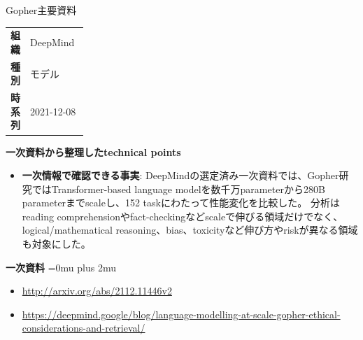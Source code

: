 \begin{technicalnote}{Gopher}{主要資料}
\begingroup
\begin{tabularx}{\linewidth}{@{}>{\bfseries}p{0.22\linewidth}X@{}}
組織 & DeepMind \\
種別 & モデル \\
時系列 & 2021-12-08 \\
\end{tabularx}
\smallskip
\begin{minipage}{\linewidth}
{\bfseries 一次資料から整理したtechnical points}
\begin{itemize}[leftmargin=1.5em,itemsep=0.35em]
\item \textbf{一次情報で確認できる事実}: DeepMindの選定済み一次資料では、Gopher研究ではTransformer-based language modelを数千万parameterから280B parameterまでscaleし、152 taskにわたって性能変化を比較した。 分析はreading comprehensionやfact-checkingなどscaleで伸びる領域だけでなく、logical/mathematical reasoning、bias、toxicityなど伸び方やriskが異なる領域も対象にした。
\end{itemize}
\begin{minipage}{\linewidth}
\begin{samepage}
{\bfseries 一次資料}
\begingroup\sloppy
\Urlmuskip=0mu plus 2mu\relax
\begin{itemize}[leftmargin=1.5em,itemsep=0.25em]
\item {\scriptsize\url{http://arxiv.org/abs/2112.11446v2}}
\item {\scriptsize\url{https://deepmind.google/blog/language-modelling-at-scale-gopher-ethical-considerations-and-retrieval/}}
\end{itemize}
\endgroup
\end{samepage}
\end{minipage}
\end{minipage}
\endgroup
\end{technicalnote}
\medskip

